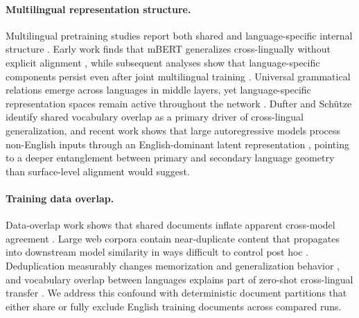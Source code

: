 \documentclass[11pt]{article}
\begin{document}
\paragraph{Multilingual representation structure.} Multilingual pretraining studies report both shared and language-specific internal structure \citep{pires2019multilingual,conneau2020unsupervised,libovicky2020language,chi2020finding}. Early work finds that mBERT generalizes cross-lingually without explicit alignment \citep{pires2019multilingual}, while subsequent analyses show that language-specific components persist even after joint multilingual training \citep{libovicky2020language}. Universal grammatical relations emerge across languages in middle layers, yet language-specific representation spaces remain active throughout the network \citep{chi2020finding}. Dufter and Sch\"{u}tze \citep{dufter2020identifying} identify shared vocabulary overlap as a primary driver of cross-lingual generalization, and recent work shows that large autoregressive models process non-English inputs through an English-dominant latent representation \citep{wendler2024llamas}, pointing to a deeper entanglement between primary and secondary language geometry than surface-level alignment would suggest.

\paragraph{Training data overlap.} Data-overlap work shows that shared documents inflate apparent cross-model agreement \citep{dodge2021documenting,lee2022deduplicating,muller2021unseen}. Large web corpora contain near-duplicate content that propagates into downstream model similarity in ways difficult to control post hoc \citep{dodge2021documenting}. Deduplication measurably changes memorization and generalization behavior \citep{lee2022deduplicating}, and vocabulary overlap between languages explains part of zero-shot cross-lingual transfer \citep{muller2021unseen}. We address this confound with deterministic document partitions that either share or fully exclude English training documents across compared runs.
\end{document}
